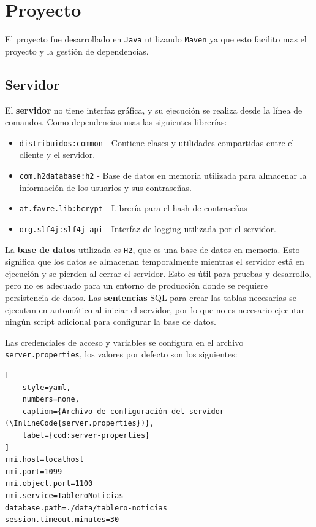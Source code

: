 \section{Proyecto}

El proyecto fue desarrollado en \texttt{Java} utilizando \texttt{Maven} ya que esto facilito mas el proyecto y la gestión de dependencias.



\subsection{Servidor}

El \textbf{servidor} no tiene interfaz gráfica, y su ejecución se realiza desde la línea de comandos. Como dependencias usas las siguientes librerías:

\begin{itemize}
    \item \texttt{distribuidos:common} - Contiene clases y utilidades compartidas entre el cliente y el servidor.
    \item \texttt{com.h2database:h2} - Base de datos en memoria utilizada para almacenar la información de los usuarios y sus contraseñas.
    \item \texttt{at.favre.lib:bcrypt} - Librería para el hash de contraseñas
    \item \texttt{org.slf4j:slf4j-api} - Interfaz de logging utilizada por el servidor.
\end{itemize}

La \textbf{base de datos} utilizada es \texttt{H2}, que es una base de datos en memoria. Esto significa que los datos se almacenan temporalmente mientras el servidor está en ejecución y se pierden al cerrar el servidor. Esto es útil para pruebas y desarrollo, pero no es adecuado para un entorno de producción donde se requiere persistencia de datos.
Las \textbf{sentencias} SQL para crear las tablas necesarias se ejecutan en automático al iniciar el servidor, por lo que no es necesario ejecutar ningún script adicional para configurar la base de datos.

Las credenciales de acceso y variables se configura en el archivo \texttt{server.properties}, los valores por defecto son los siguientes:
\begin{lstlisting}[
    style=yaml,
    numbers=none,
    caption={Archivo de configuración del servidor (\InlineCode{server.properties})},
    label={cod:server-properties}
]
rmi.host=localhost
rmi.port=1099
rmi.object.port=1100
rmi.service=TableroNoticias
database.path=./data/tablero-noticias
session.timeout.minutes=30
\end{lstlisting}

